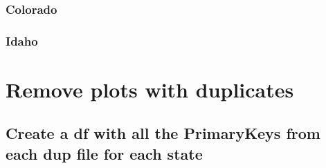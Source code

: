 \documentclass[
]{book}
\newenvironment{Shaded}{\begin{snugshade}}{\end{snugshade}}
\newcommand{\KeywordTok}[1]{\textcolor[rgb]{0.13,0.29,0.53}{\textbf{#1}}}
\newcommand{\NormalTok}[1]{#1}
\newcommand{\OperatorTok}[1]{\textcolor[rgb]{0.81,0.36,0.00}{\textbf{#1}}}
\newcommand{\StringTok}[1]{\textcolor[rgb]{0.31,0.60,0.02}{#1}}
\begin{document}
\hypertarget{colorado}{%
\subsubsection{Colorado}\label{colorado}}

\begin{Shaded}
\end{Shaded}

\hypertarget{idaho}{%
\subsubsection{Idaho}\label{idaho}}

\begin{Shaded}
\end{Shaded}

\hypertarget{remove-plots-with-duplicates}{%
\section{Remove plots with duplicates}\label{remove-plots-with-duplicates}}

\hypertarget{create-a-df-with-all-the-primarykeys-from-each-dup-file-for-each-state}{%
\subsection{Create a df with all the PrimaryKeys from each dup file for each state}\label{create-a-df-with-all-the-primarykeys-from-each-dup-file-for-each-state}}
\end{document}

